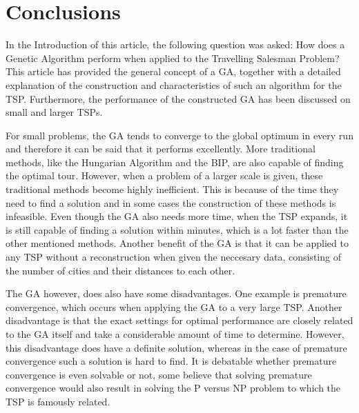 \newpage
\section{Conclusions}
\par
In the Introduction of this article, the following question was asked: How does a Genetic Algorithm perform when applied to the Travelling Salesman Problem?
This article has provided the general concept of a GA, together with a detailed explanation of the construction and characteristics of such an algorithm for the TSP. Furthermore, the performance of the constructed GA has been discussed on small and larger TSPs. 

\par
For small problems, the GA tends to converge to the global optimum in every run and therefore it can be said that it performs excellently. More traditional methods, like the Hungarian Algorithm and the BIP, are also capable of finding the optimal tour. However, when a problem of a larger scale is given, these traditional methods become highly inefficient. This is because of the time they need to find a solution and in some cases the construction of these methods is infeasible. Even though the GA also needs more time, when the TSP expands, it is still capable of finding a solution within minutes, which is a lot faster than the other mentioned methods. Another benefit of the GA is that it can be applied to any TSP without a reconstruction when given the neccesary data, consisting of the number of cities and their distances to each other. 

\par
The GA however, does also have some disadvantages. One example is premature convergence, which occurs when applying the GA to a very large TSP. Another disadvantage is that the exact settings for optimal performance are closely related to the GA itself and take a considerable amount of time to determine. However, this disadvantage does have a definite solution, whereas in the case of premature convergence such a solution is hard to find. It is debatable whether premature convergence is even solvable or not, some believe that solving premature convergence would also result in solving the P versus NP problem to which the TSP is famously related. 


